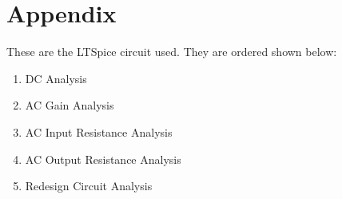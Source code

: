 \documentclass{article}
\begin{document}
\clearpage{}

\printbibliography{}

\clearpage{}

\section{Appendix}

These are the LTSpice circuit used.
They are ordered shown below:
\begin{enumerate}
    \item DC Analysis
    \item AC Gain Analysis
    \item AC Input Resistance Analysis
    \item AC Output Resistance Analysis
    \item Redesign Circuit Analysis
\end{enumerate}






\end{document}
